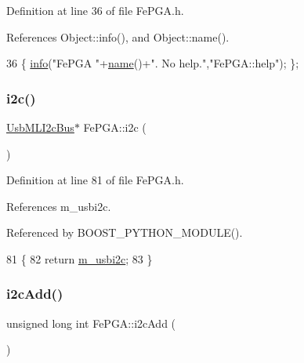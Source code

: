 Definition at line 36 of file Fe\+P\+G\+A.\+h.



References Object\+::info(), and Object\+::name().


\begin{DoxyCode}
36 \{ \hyperlink{classObject_a644fd329ea4cb85f54fa6846484b84a8}{info}(\textcolor{stringliteral}{"FePGA "}+\hyperlink{classObject_a300f4c05dd468c7bb8b3c968868443c1}{name}()+\textcolor{stringliteral}{". No help."},\textcolor{stringliteral}{"FePGA::help"}); \};
\end{DoxyCode}
\mbox{\label{classFePGA_a1553db5010cce9e3495aa3060baf0b3c}} 
\subsubsection{\texorpdfstring{i2c()}{i2c()}}
{\footnotesize\ttfamily \hyperlink{classUsbMLI2cBus}{Usb\+M\+L\+I2c\+Bus}$\ast$ Fe\+P\+G\+A\+::i2c (\begin{DoxyParamCaption}{ }\end{DoxyParamCaption})\hspace{0.3cm}{\ttfamily [inline]}}



Definition at line 81 of file Fe\+P\+G\+A.\+h.



References m\+\_\+usbi2c.



Referenced by B\+O\+O\+S\+T\+\_\+\+P\+Y\+T\+H\+O\+N\+\_\+\+M\+O\+D\+U\+L\+E().


\begin{DoxyCode}
81                     \{
82     \textcolor{keywordflow}{return} \hyperlink{classFePGA_a09fdde4002008daa0d15672772dd4483}{m\_usbi2c};
83   \}
\end{DoxyCode}
\mbox{\label{classFePGA_a26b690b730b5f668ab28fb8deab8326b}} 
\subsubsection{\texorpdfstring{i2c\+Add()}{i2cAdd()}}
{\footnotesize\ttfamily unsigned long int Fe\+P\+G\+A\+::i2c\+Add (\begin{DoxyParamCaption}{ }\end{DoxyParamCaption})}



